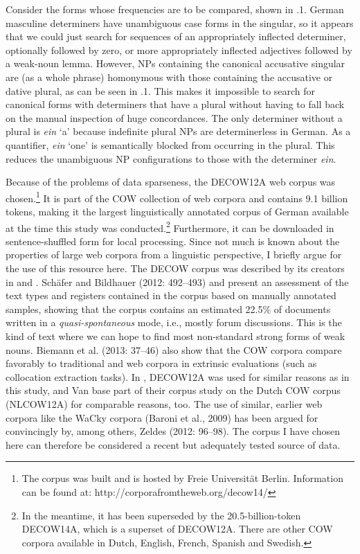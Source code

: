\begin{styleMoutonText}
Consider the forms whose frequencies are to be compared, shown in .1. German masculine determiners have unambiguous case forms in the singular, so it appears that we could just search for sequences of an appropriately inflected determiner, optionally followed by zero, or more appropriately inflected adjectives followed by a weak-noun lemma. However, NPs containing the canonical accusative singular are (as a whole phrase) homonymous with those containing the accusative or dative plural, as can be seen in .1. This makes it impossible to search for canonical forms with determiners that have a plural without having to fall back on the manual inspection of huge concordances. The only determiner without a plural is \textit{ein} ‘a’ because indefinite plural NPs are determinerless in German. As a quantifier, \textit{ein} ‘one’ is semantically blocked from occurring in the plural. This reduces the unambiguous NP configurations to those with the determiner \textit{ein}.
\end{styleMoutonText}

\begin{styleMoutonText}
Because of the problems of data sparseness, the DECOW12A web corpus was chosen.\footnote{The corpus was built and is hosted by Freie Universität  Berlin. Information can be found at: http://corporafromtheweb.org/decow14/} It is part of the COW collection of web corpora and contains 9.1 billion tokens, making it the largest linguistically annotated corpus of German available at the time this study was conducted.\footnote{In the meantime, it has been superseded by the 20.5-billion-token DECOW14A, which is a superset of DECOW12A. There are other COW corpora available in Dutch, English, French, Spanish and Swedish.} Furthermore, it can be downloaded in sentence-shuffled form for local processing. Since not much is known about the properties of large web corpora from a linguistic perspective, I briefly argue for the use of this resource here. The DECOW corpus was described by its creators in \citet{SchäferBildhauer2012} and \citet{SchäferBildhauer2013}. Schäfer and Bildhauer (2012: 492–493) and \citet[48]{BiemannEtAl2013} present an assessment of the text types and registers contained in the corpus based on manually annotated samples, showing that the corpus contains an estimated 22.5\% of documents written in a \textit{quasi-spontaneous} mode, i.e., mostly forum discussions. This is the kind of text where we can hope to find most non-standard strong forms of weak nouns. Biemann et al. (2013: 37–46) also show that the COW corpora compare favorably to traditional and web corpora in extrinsic evaluations (such as collocation extraction tasks). In \citet{SchäferSayatz2014}, DECOW12A was used for similar reasons as in this study, and Van \citet{GoethemHiligsmann2014} base part of their corpus study on the Dutch COW corpus (NLCOW12A) for comparable reasons, too. The use of similar, earlier web corpora like the WaCky corpora (Baroni et al., 2009) has been argued for convincingly by, among others, Zeldes (2012: 96–98). The corpus I have chosen here can therefore be considered a recent but adequately tested source of data.
\end{styleMoutonText}

